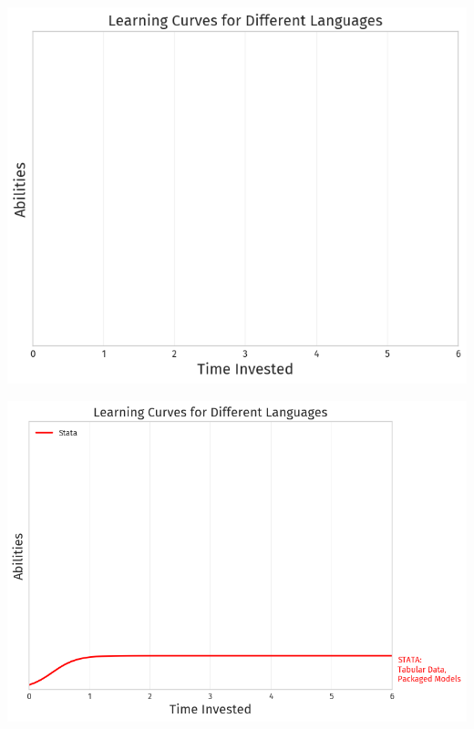 \documentclass[11pt]{beamer}
\begin{document}
\begin{frame}[c]{}
	\centering
	\includegraphics[width=\textwidth ]{language_0.png}
\end{frame}

\begin{frame}[c]{}
	\centering
	\includegraphics[width=\textwidth ]{language_1.png}
\end{frame}
\end{document}
